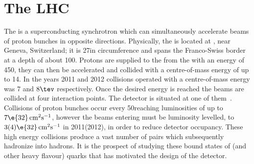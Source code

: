 \section{The LHC}
The \lhc is a superconducting synchrotron which can simultaneously accelerate beams of proton
bunches in opposite directions.
Physically, the \lhc is located at \cern, near Geneva, Switzerland; it is 27\km in
circumference and spans the Franco-Swiss border at a depth of about 100\m.
Protons are supplied to the \lhc from the \sps with an energy of 450\gev, they can then
be accelerated and collided with a centre-of-mass energy of up to 14\tev.
In the years 2011 and 2012 collisions operated with a centre-of-mass energy was 7 and $8\tev$
respectively.
Once the desired energy is reached the beams are collided at four interaction points.
The \lhcb detector is
situated at one of them~\cite{Alves:2008zz}.
Collisions of proton bunches occur every 50\ns reaching luminosities of up to
$7\e{32}\,\mathrm{cm}^{2}\mathrm{s}^{-1}$, however the beams entering \lhcb must be luminosity
levelled, to $3(4)\e{32}\,\mathrm{cm}^{2}\mathrm{s}^{-1}$ in 2011(2012), in order to reduce
detector occupancy.
These high energy collisions produce a vast number of \bbbar pairs which subsequently hadronize
into \bquark hadrons.
It is the prospect of studying these bound states of \bquark (and other heavy
flavour) quarks that has motivated the design of the \lhcb detector.


